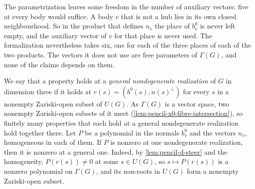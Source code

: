 \begin{fmlnote}
  The parametrization leaves some freedom in the number of auxiliary
  vectors: five at every body would suffice. A body $v$ that is not a hub
  lies in its own closed neighbourhood. So in the product that defines
  $n_v$ the place of $b^0_v$ is never left empty, and the auxiliary
  vector of $v$ for that place is never used. The formalization
  nevertheless takes six, one for each of the three places of each of the
  two products. The vectors it does not use are free parameters of
  $\Gamma(G)$, and none of the claims depends on them.
\end{fmlnote}

We say that a property holds at a \emph{general nondegenerate
realization} of $G$ in dimension three if it holds at $r(s) = (b^0(s),
n(s)^{\perp})$ for every $s$ in a nonempty Zariski-open subset of $U(G)$.
As $\Gamma(G)$ is a vector space, two nonempty Zariski-open subsets of it
meet (\cref{lem:pencil-x0-fibre-intersection}), so finitely many
properties that each hold at a general nondegenerate realization hold
together there. Let $P$ be a polynomial in the normals $b^0_v$ and the
vectors $n_v$, homogeneous in each of them. If $P$ is nonzero at one
nondegenerate realization, then it is nonzero at a general one. Indeed,
by \cref{lem:pencil-d-steer} and the homogeneity, $P(r(s)) \ne 0$ at some
$s \in U(G)$, so $s \mapsto P(r(s))$ is a nonzero polynomial on
$\Gamma(G)$, and its non-roots in $U(G)$ form a nonempty Zariski-open
subset.

